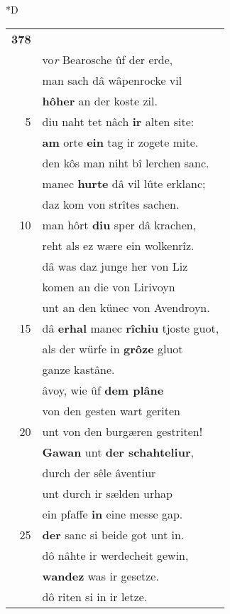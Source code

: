 \documentclass[8pt,a4paper,notitlepage]{article}
\begin{document}
\begin{table}[ht]
\begin{minipage}[t]{0.5\linewidth}
\small
\begin{center}*D
\end{center}
\begin{tabular}{rl}
\textbf{378} & \textbf{\begin{large}D\end{large}â wære} ze swachem werde,\\ 
 & vo\textit{r} Bearosche ûf der erde,\\ 
 & man sach dâ wâpenrocke vil\\ 
 & \textbf{hôher} an der koste zil.\\ 
5 & diu naht tet nâch \textbf{ir} alten site:\\ 
 & \textbf{am} orte \textbf{ein} tag ir zogete mite.\\ 
 & den kôs man niht bî lerchen sanc.\\ 
 & manec \textbf{hurte} dâ vil lûte erklanc;\\ 
 & daz kom von strîtes sachen.\\ 
10 & man hôrt \textbf{diu} sper dâ krachen,\\ 
 & reht als ez wære ein wolkenrîz.\\ 
 & dâ was daz junge her von Liz\\ 
 & komen an die von Lirivoyn\\ 
 & unt an den künec von Avendroyn.\\ 
15 & dâ \textbf{erhal} manec \textbf{rîchiu} tjoste guot,\\ 
 & als der würfe in \textbf{grôze} gluot\\ 
 & ganze kastâne.\\ 
 & âvoy, wie ûf \textbf{dem plâne}\\ 
 & von den gesten wart geriten\\ 
20 & unt von den burgæren gestriten!\\ 
 & \textbf{Gawan} unt \textbf{der schahteliur},\\ 
 & durch der sêle âventiur\\ 
 & unt durch ir sælden urhap\\ 
 & ein pfaffe \textbf{in} eine messe gap.\\ 
25 & \textbf{der} sanc si beide got unt in.\\ 
 & dô nâhte ir werdecheit gewin,\\ 
 & \textbf{wandez} was ir gesetze.\\ 
 & dô riten si in ir letze.\\ 

\end{tabular}
\end{minipage}
\end{table}
\end{document}
